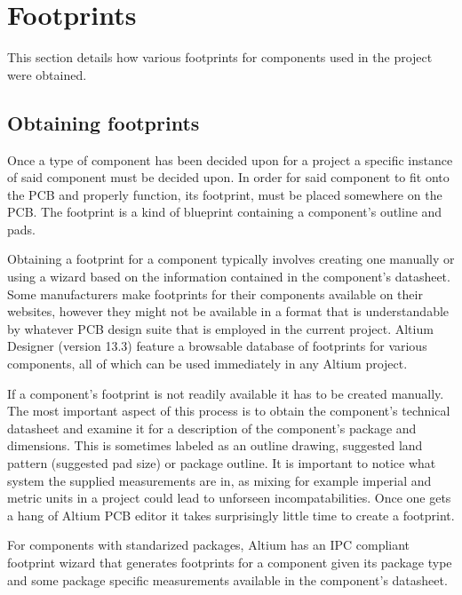\section{Footprints}
This section details how various footprints for components used in the project were obtained.

\subsection{Obtaining footprints}
Once a type of component has been decided upon for a project a specific instance of said component must be decided upon.
In order for said component to fit onto the PCB and properly function, its footprint, must be placed somewhere on the PCB.
The footprint is a kind of blueprint containing a component's outline and pads.

Obtaining a footprint for a component typically involves creating one manually or using a wizard based on the information contained in the component's datasheet.
Some manufacturers make footprints for their components available on their websites, however they might not be available in a format that is understandable by whatever PCB design suite that is employed in the current project.
Altium Designer (version 13.3) feature a browsable database of footprints for various components, all of which can be used immediately in any Altium project.

If a component's footprint is not readily available it has to be created manually.
The most important aspect of this process is to obtain the component's technical datasheet and examine it for a description of the component's package and dimensions.
This is sometimes labeled as an outline drawing, suggested land pattern (suggested pad size) or package outline.
It is important to notice what system the supplied measurements are in, as mixing for example imperial and metric units in a project could lead to unforseen incompatabilities.
Once one gets a hang of Altium PCB editor it takes surprisingly little time to create a footprint.

For components with standarized packages, Altium has an IPC compliant footprint wizard that generates footprints for a component given its package type and some package specific measurements available in the component's datasheet.

